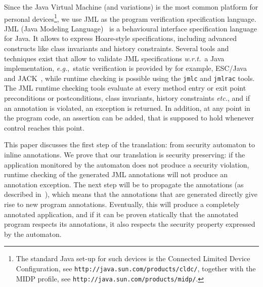 Since the Java Virtual Machine (and variations) is the most common
platform for personal devices\footnote{The standard Java set-up for
such devices is the Connected Limited Device Configuration, see
\texttt{http://java.sun.com/products/cldc/}, together with the MIDP
profile, see \texttt{http://java.sun.com/products/midp/}.}, we use JML
as the program verification specification language.  JML (Java
Modeling Language)~\cite{LeavensPCCRCK05} is a behavioural interface
specification language for Java. It allows to express Hoare-style
specifications, including advanced constructs like class invariants
and history constraints. Several tools and techniques exist that allow
to validate JML specifications \emph{w.r.t.}\ a Java implementation,
\emph{e.g.},\ static verification is provided by
for example, ESC/Java~\cite{CokK04} and
JACK~\cite{BartheBCGHMPPSV06}, while runtime checking is possible
using the \texttt{jmlc} and \texttt{jmlrac} tools. The JML runtime
checking tools evaluate at every method entry or exit point
preconditions or postconditions, class invariants, history constraints
\emph{etc.}, and if an annotation is violated, an exception is
returned. In addition, at any point in the program code, an assertion
can be added, that is supposed to hold whenever control reaches this
point.

This paper discusses the first step of the translation: from security
automaton to inline annotations. We prove that our translation is
security preserving: if the application monitored by the automaton
does not produce a security violation, runtime checking of the
generated JML annotations will not produce an annotation
exception. The next step will be to propagate the annotations (as
described in~\cite{PavlovaBBHL04}), which means that the annotations
that are generated directly give rise to new program
annotations. Eventually, this will produce a completely annotated
application, and if it can be proven statically that the annotated
program respects its annotations, it also respects the security
property expressed by the automaton.

